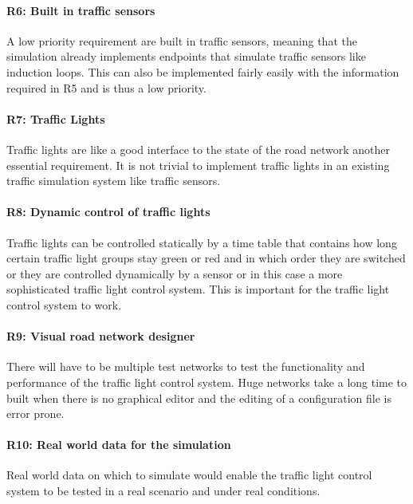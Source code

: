 \paragraph{R6: Built in traffic sensors} A low priority requirement are built in traffic sensors, meaning that the simulation already implements endpoints that simulate traffic sensors like induction loops. This can also be implemented fairly easily with the information required in R5 and is thus a low priority.

\paragraph{R7: Traffic Lights} Traffic lights are like a good interface to the state of the road network another essential requirement. It is not trivial to implement traffic lights in an existing traffic simulation system like traffic sensors.

\paragraph{R8: Dynamic control of traffic lights} Traffic lights can be controlled statically by a time table that contains how long certain traffic light groups stay green or red and in which order they are switched or they are controlled dynamically by a sensor or in this case a more sophisticated traffic light control system. This is important for the traffic light control system to work.

\paragraph{R9: Visual road network designer} There will have to be multiple test networks to test the functionality and performance of the traffic light control system. Huge networks take a long time to built when there is no graphical editor and the editing of a configuration file is error prone.

\paragraph{R10: Real world data for the simulation} Real world data on which to simulate would enable the traffic light control system to be tested in a real scenario and under real conditions.